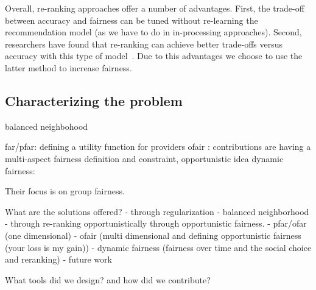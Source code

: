 Overall, re-ranking approaches offer a number of advantages. First, the trade-off between accuracy and fairness can be tuned without re-learning the recommendation model (as we have to do in in-processing approaches). Second, researchers have found that re-ranking can achieve better trade-offs versus accuracy with this type of model~\cite{abdollahpouri2019managing,liu2019personalized}. Due to this advantages we choose to use the latter method to increase fairness.




\subsection{Characterizing the problem}


balanced neighbohood

far/pfar: defining a utility function for providers
ofair : contributions are having a multi-aspect fairness definition and constraint, opportunistic idea
dynamic fairness:

Their focus is on group fairness.

What are the solutions offered?
- through regularization - balanced neighborhood
- through re-ranking opportunistically through opportunistic fairness.
    - pfar/ofar (one dimensional)
    - ofair (multi dimensional and defining opportunistic fairness (your loss is my gain))
    - dynamic fairness (fairness over time and the social choice and reranking)
    - future work

What tools did we design? and how did we contribute?